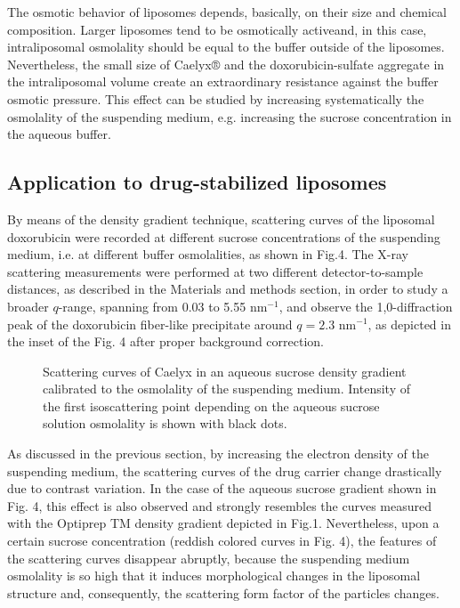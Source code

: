 The osmotic behavior of liposomes depends, basically, on their size and chemical composition. Larger liposomes tend to be osmotically activeand, in this case, intraliposomal osmolality should be equal to the buffer outside of the liposomes. Nevertheless, the small size of Caelyx® and the doxorubicin-sulfate aggregate in the intraliposomal volume create an extraordinary resistance against the buffer osmotic pressure. This effect can be studied by increasing systematically the osmolality of the suspending medium, e.g. increasing the sucrose concentration in the aqueous buffer.

\subsection{Application to drug-stabilized liposomes}
\label{sec:OsmoticCaelyx}

By means of the density gradient technique, scattering curves of the liposomal doxorubicin were recorded at different sucrose concentrations of the suspending medium, i.e. at different buffer osmolalities, as shown in Fig.4. The X-ray scattering measurements were performed at two different detector-to-sample distances, as described in the Materials and methods section, in order to study a broader $q$-range, spanning from 0.03 to 5.55 nm$^{-1}$, and observe the 1,0-diffraction peak of the doxorubicin fiber-like precipitate around $q=2.3$ nm$^{-1}$, as depicted in the inset of the Fig. 4 after proper background correction.

\begin{figure}
	\centering
		\caption{Scattering curves of Caelyx in an aqueous sucrose density gradient calibrated to the osmolality of the suspending medium. Intensity of the first isoscattering point depending on the aqueous sucrose solution osmolality is shown with black dots.}
\end{figure}

As discussed in the previous section, by increasing the electron density of the suspending medium, the scattering curves of the drug carrier change drastically due to contrast variation. In the case of the aqueous sucrose gradient shown in Fig. 4, this effect is also observed and strongly resembles the curves measured with the Optiprep TM density gradient depicted in Fig.1. Nevertheless, upon a certain sucrose concentration (reddish colored curves in Fig. 4), the features of the scattering curves disappear abruptly, because the suspending medium osmolality is so high that it induces morphological changes in the liposomal structure and, consequently, the scattering form factor of the particles changes.

